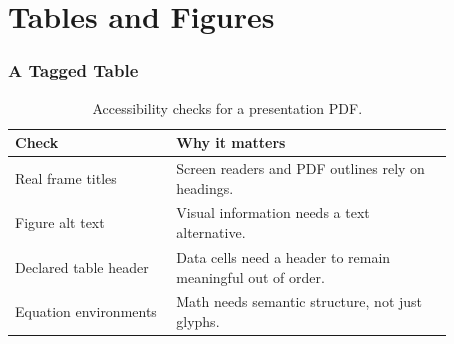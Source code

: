 \documentclass[aspect-ratio=16:9]{ltx-talk}
\begin{document}
\section{Tables and Figures}

\begin{frame}
	\frametitle{A Tagged Table}
	\begin{table}
		\centering
		\caption{Accessibility checks for a presentation PDF.}
		\label{tab:checklist}
		\begin{tabular}{>{\raggedright\arraybackslash}p{0.32\linewidth}
				>{\raggedright\arraybackslash}p{0.55\linewidth}}
			\toprule
			Check                 & Why it matters                                            \\
			\midrule
			Real frame titles     & Screen readers and PDF outlines rely on headings.          \\
			Figure alt text       & Visual information needs a text alternative.               \\
			Declared table header & Data cells need a header to remain meaningful out of order. \\
			Equation environments & Math needs semantic structure, not just glyphs.            \\
			\bottomrule
		\end{tabular}
	\end{table}
\end{frame}
\end{document}
